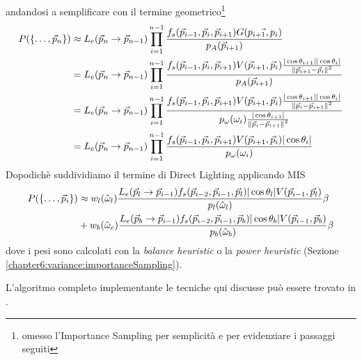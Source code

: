 andandosi a semplificare con il termine geometrico\footnote{omesso l'Importance Sampling per semplicit\`a e per evidenziare i passaggi seguiti}
\begin{align}
	P(\{\ldots,\vec{p}_{n}\})&\approx L_e(\vec{p}_n\to\vec{p}_{n-1})\prod_{i=1}^{n-1}\frac{f_s(\vec{p}_{i-1},\vec{p}_i,\vec{p}_{i+1})G(\vec{p_{i+1},p_{i}})}
		{p_A(\vec{p}_{i+1})} \nonumber \\
	&=L_e(\vec{p}_n\to\vec{p}_{n-1})\prod_{i=1}^{n-1}\frac{f_s(\vec{p}_{i-1},\vec{p}_i,\vec{p}_{i+1})V(\vec{p}_{i+1},\vec{p}_i)
		\frac{|\cos\theta_{i+1}||\cos\theta_i|}{\norm{\vec{p}_{i+1}-\vec{p}_i}^2}}{p_A(\vec{p}_{i+1})} \nonumber \\
	&=L_e(\vec{p}_n\to\vec{p}_{n-1})\prod_{i=1}^{n-1}\frac{f_s(\vec{p}_{i-1},\vec{p}_i,\vec{p}_{i+1})V(\vec{p}_{i+1},\vec{p}_i)
		\frac{|\cos\theta_{i+1}||\cos\theta_i|}{\norm{\vec{p}_i-\vec{p}_{i+1}}^2}}
		{p_\omega(\omega_i)\frac{|\cos\theta_{i+1}|}{\norm{\vec{p}_i-\vec{p}_{i+1}}^2}} \nonumber \\
	&=L_e(\vec{p}_n\to\vec{p}_{n-1})\prod_{i=1}^{n-1}\frac{f_s(\vec{p}_{i-1},\vec{p}_i,\vec{p}_{i+1})V(\vec{p}_{i+1},\vec{p}_i)
		|\cos\theta_i|}{p_\omega(\omega_i)}
\end{align}
Dopodich\`e suddividiamo il termine di Direct Lighting applicando MIS
\begin{align}
	P(\{\ldots,\vec{p}_{i}\})&\approx w_l(\hat{\omega}_l)\frac{L_e(\vec{p}_l\to\vec{p}_{i-1})f_s(\vec{p}_{i-2},\vec{p}_{i-1},\vec{p}_l)
		|\cos\theta_l|V(\vec{p}_{i-1},\vec{p}_l)}{p_l(\hat{\omega}_l)}\beta \nonumber \\
	&+w_b(\hat{\omega}_e)\frac{L_e(\vec{p}_b\to\vec{p}_{i-1})f_s(\vec{p}_{i-2},\vec{p}_{i-1},\vec{p}_b)
		|\cos\theta_b|V(\vec{p}_{i-1},\vec{p}_b)}{p_b(\hat{\omega}_b)}\beta
\end{align}
dove i pesi sono calcolati con la \textit{balance heuristic} o la \textit{power heuristic} (Sezione \ref{chapter6:variance:importanceSampling}).\par
L'algoritmo completo implementante le tecniche qui discusse pu\`o essere trovato in \cite{pharr}.
